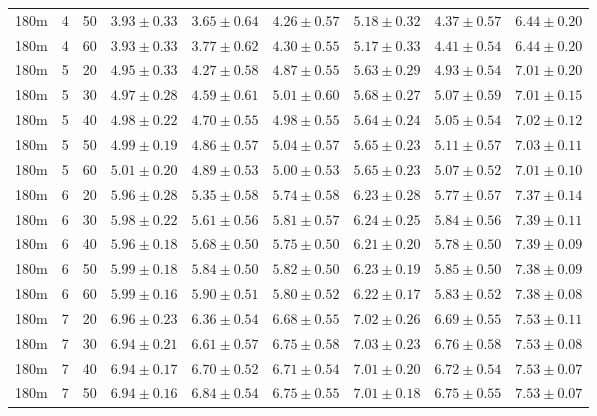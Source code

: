 \begin{table}
\begin{center}
\begin{tabular}{ccc|c|ccccc}
  180m &   4 &  50 & $3.93 \pm 0.33$ & $3.65 \pm 0.64$ & $4.26 \pm 0.57$ & $5.18 \pm 0.32$ & $4.37 \pm 0.57$ & $6.44 \pm 0.20$ \\ 
  180m &   4 &  60 & $3.93 \pm 0.33$ & $3.77 \pm 0.62$ & $4.30 \pm 0.55$ & $5.17 \pm 0.33$ & $4.41 \pm 0.54$ & $6.44 \pm 0.20$ \\ 
   \hline
180m &   5 &  20 & $4.95 \pm 0.33$ & $4.27 \pm 0.58$ & $4.87 \pm 0.55$ & $5.63 \pm 0.29$ & $4.93 \pm 0.54$ & $7.01 \pm 0.20$ \\ 
  180m &   5 &  30 & $4.97 \pm 0.28$ & $4.59 \pm 0.61$ & $5.01 \pm 0.60$ & $5.68 \pm 0.27$ & $5.07 \pm 0.59$ & $7.01 \pm 0.15$ \\ 
  180m &   5 &  40 & $4.98 \pm 0.22$ & $4.70 \pm 0.55$ & $4.98 \pm 0.55$ & $5.64 \pm 0.24$ & $5.05 \pm 0.54$ & $7.02 \pm 0.12$ \\ 
  180m &   5 &  50 & $4.99 \pm 0.19$ & $4.86 \pm 0.57$ & $5.04 \pm 0.57$ & $5.65 \pm 0.23$ & $5.11 \pm 0.57$ & $7.03 \pm 0.11$ \\ 
  180m &   5 &  60 & $5.01 \pm 0.20$ & $4.89 \pm 0.53$ & $5.00 \pm 0.53$ & $5.65 \pm 0.23$ & $5.07 \pm 0.52$ & $7.01 \pm 0.10$ \\ 
   \hline
180m &   6 &  20 & $5.96 \pm 0.28$ & $5.35 \pm 0.58$ & $5.74 \pm 0.58$ & $6.23 \pm 0.28$ & $5.77 \pm 0.57$ & $7.37 \pm 0.14$ \\ 
  180m &   6 &  30 & $5.98 \pm 0.22$ & $5.61 \pm 0.56$ & $5.81 \pm 0.57$ & $6.24 \pm 0.25$ & $5.84 \pm 0.56$ & $7.39 \pm 0.11$ \\ 
  180m &   6 &  40 & $5.96 \pm 0.18$ & $5.68 \pm 0.50$ & $5.75 \pm 0.50$ & $6.21 \pm 0.20$ & $5.78 \pm 0.50$ & $7.39 \pm 0.09$ \\ 
  180m &   6 &  50 & $5.99 \pm 0.18$ & $5.84 \pm 0.50$ & $5.82 \pm 0.50$ & $6.23 \pm 0.19$ & $5.85 \pm 0.50$ & $7.38 \pm 0.09$ \\ 
  180m &   6 &  60 & $5.99 \pm 0.16$ & $5.90 \pm 0.51$ & $5.80 \pm 0.52$ & $6.22 \pm 0.17$ & $5.83 \pm 0.52$ & $7.38 \pm 0.08$ \\ 
   \hline
180m &   7 &  20 & $6.96 \pm 0.23$ & $6.36 \pm 0.54$ & $6.68 \pm 0.55$ & $7.02 \pm 0.26$ & $6.69 \pm 0.55$ & $7.53 \pm 0.11$ \\ 
  180m &   7 &  30 & $6.94 \pm 0.21$ & $6.61 \pm 0.57$ & $6.75 \pm 0.58$ & $7.03 \pm 0.23$ & $6.76 \pm 0.58$ & $7.53 \pm 0.08$ \\ 
  180m &   7 &  40 & $6.94 \pm 0.17$ & $6.70 \pm 0.52$ & $6.71 \pm 0.54$ & $7.01 \pm 0.20$ & $6.72 \pm 0.54$ & $7.53 \pm 0.07$ \\ 
  180m &   7 &  50 & $6.94 \pm 0.16$ & $6.84 \pm 0.54$ & $6.75 \pm 0.55$ & $7.01 \pm 0.18$ & $6.75 \pm 0.55$ & $7.53 \pm 0.07$ \\ 

\end{tabular}
\end{center}
\end{table}
